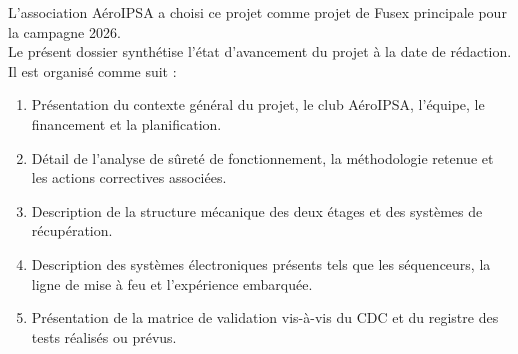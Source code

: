 L'association AéroIPSA a choisi ce projet comme projet de \gls{Fusex} principale pour la campagne 2026.\\

Le présent dossier synthétise l’état d’avancement du projet à la date de rédaction. Il est organisé comme suit :
\begin{enumerate}
    \item Présentation du contexte général du projet, le club AéroIPSA, l’équipe, le financement et la planification.
    \item Détail de l’analyse de sûreté de fonctionnement, la méthodologie retenue et les actions correctives associées.
    \item Description de la structure mécanique des deux étages et des systèmes de récupération.
    \item Description des systèmes électroniques présents tels que les séquenceurs, la ligne de mise à feu et l’expérience
    embarquée.
    \item Présentation de la matrice de validation vis-à-vis du \acrshort{CDC} et du registre des tests réalisés ou
    prévus.
\end{enumerate}

\newpage
